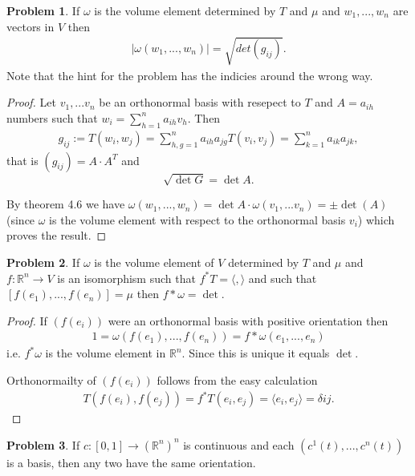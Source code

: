 \documentclass[20pt]{article}
\theoremstyle{plain}
\theoremstyle{definition}
\newtheorem*{problem}{Problem}
\newcommand{\reals}{\mathbb{R}}
\begin{document}
  \begin{problem}{4.3}
    If $\omega$ is the volume element determined by $T$ and $\mu$ and $w_1, ..., w_n$ are vectors in $V$ then 
    \begin{align*}
      |\omega(w_1, ..., w_n)| = \sqrt{det(g_{ij})}.
    \end{align*}    
    Note that the hint for the problem has the indicies around the wrong way.
  \end{problem}
  \begin{proof}
    Let $v_1, ...v_n$ be an orthonormal basis with resepect to $T$ and $A = a_{ih}$ numbers such that 
    $w_i = \sum_{h=1}^n a_{ih}v_h$.
    Then 
    \begin{align*}
      g_{ij} := T(w_i, w_j) = \sum_{h,g=1}^n a_{ih}a_{jg}T(v_i, v_j) = \sum_{k=1}^n a_{ik}a_{jk},
    \end{align*}
    that is $(g_{ij}) = A\cdot A^T$ and
    $$\sqrt{\det G} = \det A.$$

    By theorem 4.6 we have 
    $ \omega(w_1, ..., w_n) = \det A \cdot \omega(v_1, ...v_n) = \pm \det(A)$
    (since $\omega$ is the volume element with respect to the orthonormal basis $v_i$) which proves the result.
  \end{proof}



\begin{problem}{4.4}
  If $\omega$ is the volume element of $V$ determined by $T$ and $\mu$ and
  $f: \reals^n \to V$ is an isomorphism such that $f^*T = \langle, \rangle$ and such that 
  $[f(e_1), ..., f(e_n)] = \mu$ then $f*\omega = \det.$
\end{problem}

\begin{proof}
  If $(f(e_i))$ were an orthonormal basis with positive orientation then 
  \begin{align*}
    1 = \omega( f(e_1), ..., f(e_n) ) = f*\omega(e_1, ..., e_n)
  \end{align*}
  i.e. $f^*\omega$ is the volume element in $\reals^n$.  Since this is unique it equals $\det$.

  Orthonormailty of $(f(e_i))$ follows from the easy calculation
  \begin{align*}
    T(f(e_i), f(e_j)) = f^*T(e_i, e_j) = \langle e_i, e_j \rangle = \delta{ij}.
  \end{align*}
\end{proof}




\begin{problem}{4.5}
    If $c: [0, 1] \to (\reals^n)^n$ is continuous and each $(c^1(t), ..., c^n(t))$ is a basis, 
    then any two have the same orientation. 
\end{problem}
\end{document}
